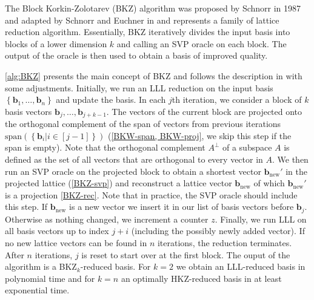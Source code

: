 The Block Korkin-Zolotarev (BKZ) algorithm was proposed by Schnorr in 1987 and adapted by Schnorr and Euchner in \cite{SE91} and represents a family of lattice reduction algorithm. Essentially, BKZ iteratively divides the input basis into blocks of a lower dimension $k$ and calling an SVP oracle on each block. The output of the oracle is then used to obtain a basis of improved quality. 

\cref{alg:BKZ} presents the main concept of BKZ and follows the description in \cite{CN11} with some adjustments. Initially, we run an LLL reduction on the input basis $\left\{\mathbf{b}_1, \dots, \mathbf{b}_{n}\right\}$ and update the basis. In each $j$th iteration, we consider a block of $k$ basis vectors $\mathbf{b}_j, \dots, \mathbf{b}_{j+k-1}$. The vectors of the current block are projected onto the orthogonal complement of the span of vectors from previous iterations $\text{span}\left(\left\{\mathbf{b}_i | i \in [j-1]\right\}\right)$ (\cref{BKW-span, BKW-proj}, we skip this step if the span is empty). Note that the orthogonal complement $A^\perp$  of a subspace $A$ is defined as the set of all vectors that are orthogonal to every vector in $A$. We then run an SVP oracle on the projected block to obtain a shortest vector $\mathbf{b}_\text{new}'$ in the projected lattice (\cref{BKZ-svp}) and reconstruct a lattice vector $\mathbf{b}_\text{new}$ of which $\mathbf{b}_\text{new}'$ is a projection \cref{BKZ-rec}. Note that in practice, the SVP oracle should include this step. If $\mathbf{b}_\text{new}$ is a new vector we insert it in our list of basis vectors before $\mathbf{b}_j$. Otherwise as nothing changed, we increment a counter $z$. Finally, we run LLL on all basis vectors up to index $j+i$ (including the possibly newly added vector). If no new lattice vectors can be found in $n$ iterations, the reduction terminates. After $n$ iterations, $j$ is reset to start over at the first block. The ouput of the algorithm is a BKZ$_k$-reduced basis. For $k=2$ we obtain an LLL-reduced basis in polynomial time and for $k=n$ an optimally HKZ-reduced basis in at least exponential time.%



